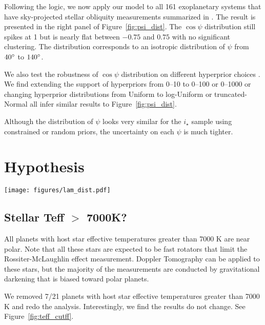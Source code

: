 \documentclass[twocolumn,times]{aastex631}
\newcommand{\numistar}{65\xspace}
\newcommand{\numall}{161\xspace}
\begin{document}
Following the logic, we now apply our model to all \numall exoplanetary systems that have sky-projected stellar obliquity measurements summarized in \cite{Albrecht22}. The result is presented in the right panel of Figure~\ref{fig:psi_dist}. The $\cos{\psi}$ distribution still spikes at 1 but is nearly flat between $-0.75$ and $0.75$ with no significant clustering. The distribution corresponds to an isotropic distribution of $\psi$ from $40\mbox{$^\circ$}$ to $140\mbox{$^\circ$}$.

We also test the robustness of $\cos{\psi}$ distribution on different hyperprior choices \citep[see a nice summary in][]{Nagpal22}. We find extending the support of hyperpriors from 0--10 to 0--100 or 0--1000 or changing hyperprior distributions from Uniform to log-Uniform or truncated-Normal all infer similar results to Figure~\ref{fig:psi_dist}.

Although the distribution of $\psi$ looks very similar for the $i_\star$ sample using constrained or random priors, the uncertainty on each $\psi$ is much tighter. 

\section{Hypothesis} \label{sec:tests}

\begin{figure*}[ht!]
    \begin{centering}
        \texttt{[image: figures/lam\_dist.pdf]}
        \caption{Sky-projected stellar obliquity ($\lambda$) distributions of \numistar systems with constrained $i_\star$ and all \numall exoplanetary systems that have measured sky-projected stellar obliquities.}
        \label{fig:lam_dist}
    \end{centering}
\end{figure*}


\subsection{Stellar Teff $>$ 7000K?}
All planets with host star effective temperatures greater than 7000 K are near polar.
Note that all these stars are expected to be fast rotators that limit the Rossiter-McLaughlin effect measurement. Doppler Tomography can be applied to these stars, but the majority of the measurements are conducted by gravitational darkening that is biased toward polar planets.

We removed 7/21 planets with host star effective temperatures greater than 7000 K and redo the analysis. Interestingly, we find the results do not change. See Figure~\ref{fig:teff_cutff}.
\end{document}
